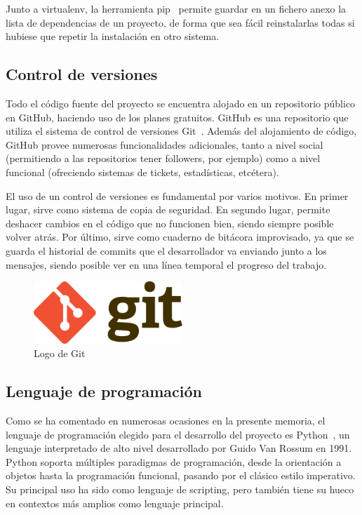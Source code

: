 Junto a virtualenv, la herramienta pip~\cite{pip} permite guardar en un fichero anexo
la lista de dependencias de un proyecto, de forma que sea fácil reinstalarlas todas
si hubiese que repetir la instalación en otro sistema.

\subsection{Control de versiones}

Todo el código fuente del proyecto se encuentra alojado en un repositorio público
en GitHub, haciendo uso de los planes gratuitos. GitHub es una repositorio que
utiliza el sistema de control de versiones Git~\cite{git}. Además del alojamiento de
código, GitHub provee numerosas funcionalidades adicionales, tanto a nivel
social (permitiendo a las repositorios tener followers, por ejemplo) como a nivel funcional
(ofreciendo sistemas de tickets, estadísticas, etcétera).

El uso de un control de versiones es fundamental por varios motivos. En primer
lugar, sirve como sistema de copia de seguridad. En segundo lugar, permite deshacer
cambios en el código que no funcionen bien, siendo siempre posible volver
atrás. Por último, sirve como cuaderno de bitácora improvisado, ya que se guarda
el historial de commits que el desarrollador va enviando junto a los mensajes,
siendo posible ver en una línea temporal el progreso del trabajo.

\begin{figure}[htbp]
    \centering
    \includegraphics[width=0.5\textwidth]{6_implementacion/git_logo}
    \caption{Logo de Git}
    \label{fig:git-logo}
\end{figure}

\subsection{Lenguaje de programación}

Como se ha comentado en numerosas ocasiones en la presente memoria, el lenguaje
de programación elegido para el desarrollo del proyecto es Python~\cite{python}, un
lenguaje interpretado de alto nivel desarrollado por Guido Van Rossum en 1991.
Python soporta múltiples paradigmas de programación, desde la orientación a objetos
hasta la programación funcional, pasando por el clásico estilo imperativo. Su
principal uso ha sido como lenguaje de scripting, pero también tiene su hueco en
contextos más amplios como lenguaje principal.

